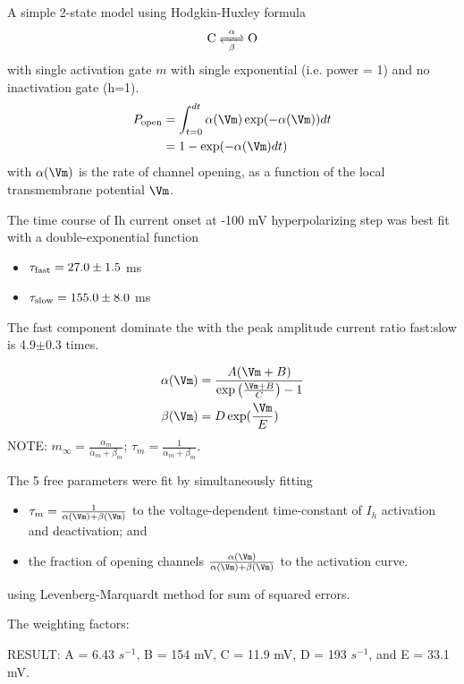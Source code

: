 A simple 2-state model using Hodgkin-Huxley formula
\begin{equation}
\ce{C <=>[\alpha][\beta] O}
\end{equation}
with single activation gate
$m$ with single exponential (i.e. power = 1) and no inactivation gate (h=1).
\begin{equation}
\begin{split}
P_\open &= \int_{t=0}^{dt} \alpha(\Vm) \exp(-\alpha(\Vm)) dt \\
        &= 1 - \exp( -\alpha(\Vm)dt)
\end{split}
\end{equation}
with $\alpha(\Vm)$ is the rate of channel opening, as a function of the local
transmembrane potential $\Vm$.

\begin{mdframed}
The time course of Ih current onset at -100 mV hyperpolarizing step was best fit
with a double-exponential function
\begin{itemize}
  \item $\tau_{{\text{fast}}} = 27.0\pm 1.5$ ms

  \item $\tau_{{\text{slow}}} = 155.0 \pm 8.0$ ms
\end{itemize}
The fast component dominate the with the peak amplitude current ratio fast:slow
is 4.9$\pm$0.3 times.

\end{mdframed}


\begin{equation}
\begin{split}
\alpha(\Vm) &= \frac{A(\Vm + B)}{\exp\left(  \frac{\Vm + B}{C}\right) - 1} \\
\beta(\Vm) &= D \exp(\frac{\Vm}{E})
\end{split}
\end{equation}
NOTE: $m_\infty = \frac{\alpha_m}{\alpha_m + \beta_m}$;
$\tau_m = \frac{1}{\alpha_m + \beta_m}$.



\begin{mdframed}

The 5 free parameters were fit by simultaneously fitting
\begin{itemize}
  \item $\tau_m = \frac{1}{\alpha(\Vm) + \beta(\Vm)}$ to the voltage-dependent
time-constant of $I_h$ activation and deactivation; and

  \item the fraction of opening channels
  $\frac{\alpha(\Vm)}{\alpha(\Vm) + \beta(\Vm)}$ to the activation curve.
\end{itemize}
using Levenberg-Marquardt method for sum of squared errors.

The weighting factors:


RESULT: A = 6.43 $s^{-1}$, B = 154 mV, C = 11.9 mV, D = 193 $s^{-1}$,
and E  =  33.1 mV.

\end{mdframed}




